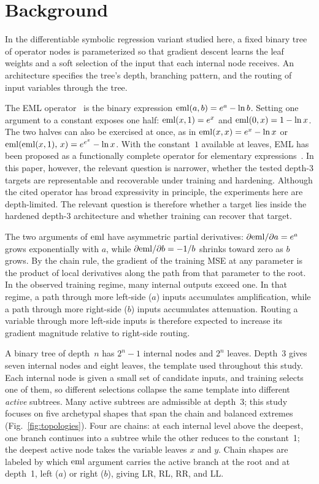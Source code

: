 \section{Background}
\label{sec:background}

In the differentiable symbolic regression variant studied here, a
fixed binary tree of operator nodes is parameterized so that
gradient descent learns the leaf weights and a soft selection of
the input that each internal node receives.  An architecture
specifies the tree's depth, branching pattern, and the routing of
input variables through the tree.

The EML operator~\citep{Odrzywolek2026eml} is the binary
expression $\mathrm{eml}(a,b) = e^a - \ln b$.  Setting one argument to a
constant exposes one half: $\mathrm{eml}(x,1) = e^x$ and
$\mathrm{eml}(0,x) = 1 - \ln x$.  The two halves can also be exercised
at once, as in $\mathrm{eml}(x,x) = e^x - \ln x$ or
$\mathrm{eml}(\mathrm{eml}(x,1),\,x) = e^{e^x} - \ln x$.  With the constant~$1$
available at leaves, EML has been proposed as a functionally
complete operator for elementary
expressions~\citep{Odrzywolek2026eml}.  In this paper, however,
the relevant question is narrower, whether the tested depth-3
targets are representable and recoverable under training and
hardening.  Although the cited operator has broad expressivity
in principle, the experiments here are depth-limited.  The
relevant question is therefore whether a target lies inside the
hardened depth-3 architecture and whether training can recover
that target.

The two arguments of $\mathrm{eml}$ have asymmetric partial derivatives:
$\partial\mathrm{eml}/\partial a = e^a$ grows exponentially with $a$,
while $\partial\mathrm{eml}/\partial b = -1/b$ shrinks toward zero as
$b$ grows.  By the chain rule, the gradient of the training MSE
at any parameter is the product of local derivatives along the
path from that parameter to the root.  In the observed training
regime, many internal outputs exceed one.  In that regime, a
path through more left-side ($a$) inputs accumulates
amplification, while a path through more right-side ($b$) inputs
accumulates attenuation.  Routing a variable through more
left-side inputs is therefore expected to increase its gradient
magnitude relative to right-side routing.

A binary tree of depth~$n$ has $2^n - 1$ internal nodes and
$2^n$ leaves.  Depth~3 gives seven internal nodes and eight leaves,
the template used throughout this study.  Each internal node is
given a small set of candidate inputs, and training selects one of
them, so different selections collapse the same template into
different \emph{active} subtrees.  Many active subtrees are
admissible at depth~3; this study focuses on five archetypal
shapes that span the chain and balanced extremes
(Fig.~\ref{fig:topologies}).  Four are chains: at each internal
level above the deepest, one branch continues into a subtree
while the other reduces to the constant~1; the deepest active
node takes the variable leaves $x$ and $y$.  Chain shapes are labeled by which $\mathrm{eml}$
argument carries the active branch at the root and at depth~1,
left ($a$) or right ($b$), giving LR, RL, RR, and LL.

